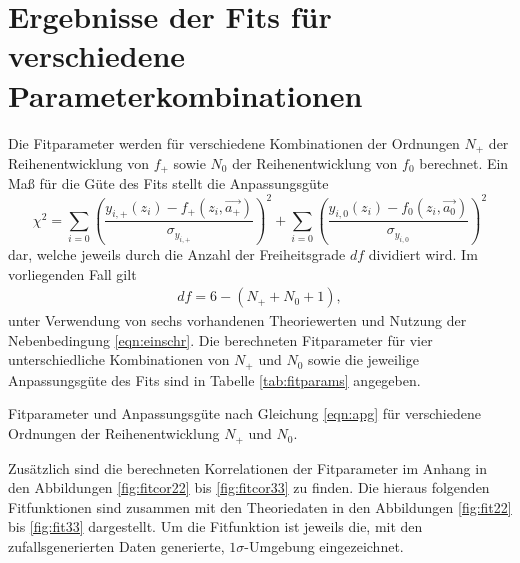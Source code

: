 \section{Ergebnisse der Fits für verschiedene Parameterkombinationen}
\label{sec:fits}

Die Fitparameter werden für verschiedene Kombinationen der Ordnungen $N_+$ der Reihenentwicklung von $f_+$ sowie $N_0$ der Reihenentwicklung von $f_0$ berechnet.
Ein Maß für die Güte des Fits stellt die Anpassungsgüte
\begin{equation}
  \label{eqn:apg}
  \chi^2 = \sum_{i=0}^{} \left( \frac{y_{i,+}(z_i) - f_{+}(z_i, \vec{a_+})}{\sigma_{y_{i,+}}} \right)^2 + \sum_{i=0}^{} \left( \frac{y_{i,0}(z_i) - f_{0}(z_i, \vec{a_0})}{\sigma_{y_{i,0}}}  \right)^2
\end{equation}
dar, welche jeweils durch die Anzahl der Freiheitsgrade $df$ dividiert wird.
Im vorliegenden Fall gilt
\begin{align*}
  df = 6 - (N_+ + N_0 + 1),
\end{align*}
unter Verwendung von sechs vorhandenen Theoriewerten und Nutzung der Nebenbedingung \eqref{eqn:einschr}.
Die berechneten Fitparameter für vier unterschiedliche Kombinationen von $N_+$ und $N_0$ sowie die jeweilige Anpassungsgüte des Fits sind in Tabelle \ref{tab:fitparams} angegeben.
\begin{table}
  \centering
  \caption{Fitparameter und Anpassungsgüte nach Gleichung \eqref{eqn:apg} für verschiedene Ordnungen der Reihenentwicklung $N_+$ und $N_0$.}
  \begin{subtable}{0.48\textwidth}
    \centering
    
  \end{subtable}
  \begin{subtable}{0.48\textwidth}
    \centering
    
  \end{subtable}
  \begin{subtable}[t]{0.48\textwidth}
    \vspace{15px}
    \centering
    
  \end{subtable}
  \begin{subtable}[t]{0.48\textwidth}
    \vspace{15px}
    \centering
    
  \end{subtable}
  \vspace{10px}
  \label{tab:fitparams}
\end{table}
Zusätzlich sind die berechneten Korrelationen der Fitparameter im Anhang in den Abbildungen \ref{fig:fitcor22} bis \ref{fig:fitcor33} zu finden.
Die hieraus folgenden Fitfunktionen sind zusammen mit den Theoriedaten in den Abbildungen \ref{fig:fit22} bis \ref{fig:fit33} dargestellt.
Um die Fitfunktion ist jeweils die, mit den zufallsgenerierten Daten generierte, $\num{1}\sigma$-Umgebung eingezeichnet.

